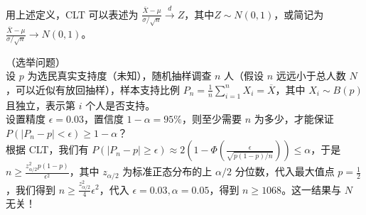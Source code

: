 \documentclass[../main.tex]{subfiles}
\begin{document}
用上述定义，CLT 可以表述为 $\frac{\overline X-\mu}{\sigma/\sqrt n}\overset{d}{\rightarrow}Z$，其中$Z\sim N(0,1)$，或简记为 $\frac{\overline X-\mu}{\sigma/\sqrt n}\rightarrow N(0,1)$。

\begin{example}
    （选举问题）\\
    设 $p$ 为选民真实支持度（未知），随机抽样调查 $n$ 人（假设 $n$ 远远小于总人数 $N$，可以近似有放回抽样），样本支持比例 $P_n=\frac1n\sum_{i=1}^nX_i=\overline X$，其中 $X_i\sim B(p)$ 且独立，表示第 $i$ 个人是否支持。\\
    设置精度 $\epsilon=0.03$，置信度 $1-\alpha=95\%$，则至少需要 $n$ 为多少，才能保证 $P(|P_n-p|<\epsilon)\geq1-\alpha$？\\
    根据 CLT，我们有 $P(|P_n-p|\geq\epsilon)\approx2\left(1-\Phi(\frac\epsilon{\sqrt{p(1-p)/n}})\right)\leq\alpha$，于是 $n\geq\frac{z_{\alpha/2}^2p(1-p)}{\epsilon^2}$，其中 $z_{\alpha/2}$ 为标准正态分布的上 $\alpha/2$ 分位数，代入最大值点 $p=\frac12$，我们得到 $n\geq\frac{z_{\alpha/2}^2}4\epsilon^2$，代入 $\epsilon=0.03,\alpha=0.05$，得到 $n\geq1068$。这一结果与 $N$ 无关！
\end{example}
\end{document}
